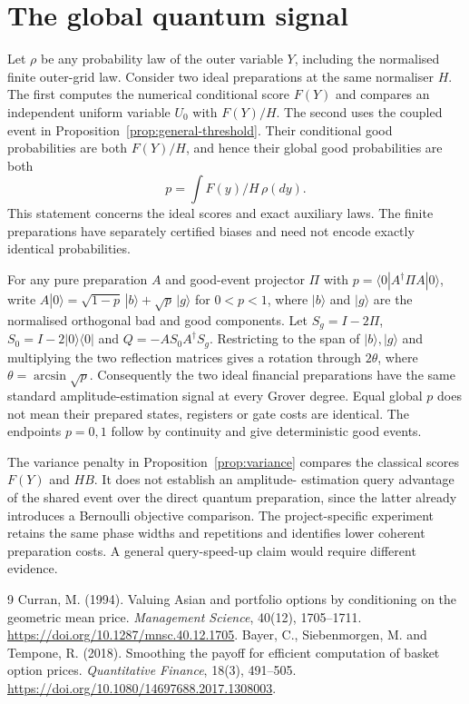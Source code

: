 \documentclass[11pt,a4paper]{article}
\begin{document}
\section{The global quantum signal}
Let $\rho$ be any probability law of the outer variable $Y$, including the
normalised finite outer-grid law. Consider two ideal preparations at the
same normaliser $H$. The first computes the numerical conditional score
$F(Y)$ and compares an independent uniform variable $U_0$ with $F(Y)/H$.
The second uses the coupled event in Proposition~\ref{prop:general-threshold}.
Their conditional good probabilities are both $F(Y)/H$, and hence their
global good probabilities are both
\[
 p=\int F(y)/H\,\rho(dy).
\]
This statement concerns the ideal scores and exact auxiliary laws. The
finite preparations have separately certified biases and need not encode
exactly identical probabilities.

For any pure preparation $A$ and good-event projector $\Pi$ with
$p=\langle0|A^\dagger\Pi A|0\rangle$, write
$A|0\rangle=\sqrt{1-p}\,|b\rangle+\sqrt p\,|g\rangle$ for $0<p<1$,
where $|b\rangle$ and $|g\rangle$ are the normalised orthogonal bad and good
components. Let $S_g=I-2\Pi$, $S_0=I-2|0\rangle\langle0|$ and
$Q=-AS_0A^\dagger S_g$. Restricting to the span of $|b\rangle,|g\rangle$
and multiplying the two reflection matrices gives a rotation through
$2\theta$, where $\theta=\arcsin\sqrt p$. Consequently the two ideal
financial preparations have the same standard amplitude-estimation signal
at every Grover degree. Equal global $p$ does not mean their prepared
states, registers or gate costs are identical. The endpoints $p=0,1$ follow
by continuity and give deterministic good events.

The variance penalty in Proposition~\ref{prop:variance} compares the
classical scores $F(Y)$ and $HB$. It does not establish an amplitude-
estimation query advantage of the shared event over the direct quantum
preparation, since the latter already introduces a Bernoulli objective
comparison. The project-specific experiment retains the same phase widths
and repetitions and identifies lower coherent preparation costs. A general
query-speed-up claim would require different evidence.

\begin{thebibliography}{9}
Curran, M. (1994). Valuing Asian and portfolio options by conditioning on
the geometric mean price. \emph{Management Science}, 40(12), 1705--1711.
\url{https://doi.org/10.1287/mnsc.40.12.1705}.
Bayer, C., Siebenmorgen, M. and Tempone, R. (2018). Smoothing the payoff
for efficient computation of basket option prices. \emph{Quantitative
Finance}, 18(3), 491--505.
\url{https://doi.org/10.1080/14697688.2017.1308003}.
\end{thebibliography}
\end{document}
